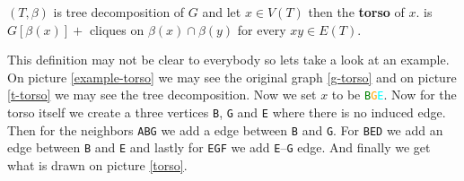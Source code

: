 \begin{defn}
	$(T, \beta)$ is tree decomposition of $G$ and let $x \in V(T)$ then the \textbf{torso} of $x$. is $G[\beta(x)] + $ cliques on $\beta(x) \cap \beta(y)$ for every $xy \in E(T)$.
\end{defn}

This definition may not be clear to everybody so lets take a look at an example. On picture \ref{example-torso} we may see the original graph \ref{g-torso} and on picture \ref{t-torso} we may see the tree decomposition. Now we set $x$ to be \texttt{\textcolor{Green}{B}\textcolor{orange}{G}\textcolor{cyan}{E}}. Now for the torso itself we create a three vertices \texttt{B}, \texttt{G} and \texttt{E} where there is no induced edge. Then for the neighbors \texttt{ABG} we add a edge between \texttt{B} and \texttt{G}. For \texttt{BED} we add an edge between \texttt{B} and \texttt{E} and lastly for \texttt{EGF} we add \texttt{E}--\texttt{G} edge. And finally we get what is drawn on picture \ref{torso}.

